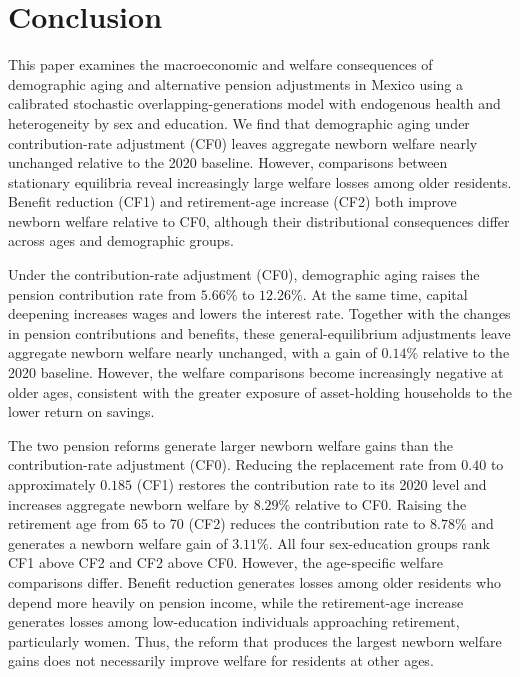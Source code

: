 \documentclass[12pt,a4paper]{article}
\begin{document}



\section{Conclusion}
\label{sec:conclusion}

This paper examines the macroeconomic and welfare consequences of demographic aging and alternative pension adjustments in Mexico using a calibrated stochastic overlapping-generations model with endogenous health and heterogeneity by sex and education. We find that demographic aging under contribution-rate adjustment (CF0) leaves aggregate newborn welfare nearly unchanged relative to the 2020 baseline. However, comparisons between stationary equilibria reveal increasingly large welfare losses among older residents. Benefit reduction (CF1) and retirement-age increase (CF2) both improve newborn welfare relative to CF0, although their distributional consequences differ across ages and demographic groups.

Under the contribution-rate adjustment (CF0), demographic aging raises the pension contribution rate from $5.66\%$ to $12.26\%$. At the same time, capital deepening increases wages and lowers the interest rate. Together with the changes in pension contributions and benefits, these general-equilibrium adjustments leave aggregate newborn welfare nearly unchanged, with a gain of $0.14\%$ relative to the 2020 baseline. However, the welfare comparisons become increasingly negative at older ages, consistent with the greater exposure of asset-holding households to the lower return on savings.

The two pension reforms generate larger newborn welfare gains than the contribution-rate adjustment (CF0). Reducing the replacement rate from $0.40$ to approximately $0.185$ (CF1) restores the contribution rate to its 2020 level and increases aggregate newborn welfare by $8.29\%$ relative to CF0. Raising the retirement age from 65 to 70 (CF2) reduces the contribution rate to $8.78\%$ and generates a newborn welfare gain of $3.11\%$. All four sex-education groups rank CF1 above CF2 and CF2 above CF0. However, the age-specific welfare comparisons differ. Benefit reduction generates losses among older residents who depend more heavily on pension income, while the retirement-age increase generates losses among low-education individuals approaching retirement, particularly women. Thus, the reform that produces the largest newborn welfare gains does not necessarily improve welfare for residents at other ages.
\end{document}
